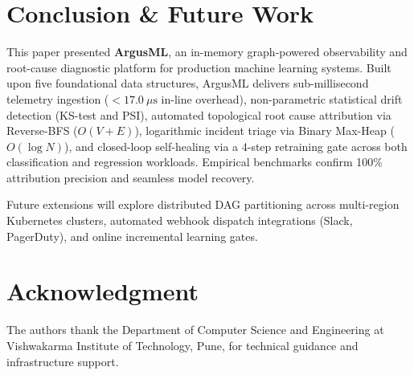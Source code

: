 \documentclass[conference]{IEEEtran}
\begin{document}
\section{Conclusion \& Future Work}
This paper presented \textbf{ArgusML}, an in-memory graph-powered observability and root-cause diagnostic platform for production machine learning systems. Built upon five foundational data structures, ArgusML delivers sub-millisecond telemetry ingestion ($<17.0\ \mu\text{s}$ in-line overhead), non-parametric statistical drift detection (KS-test and PSI), automated topological root cause attribution via Reverse-BFS ($O(V+E)$), logarithmic incident triage via Binary Max-Heap ($O(\log N)$), and closed-loop self-healing via a 4-step retraining gate across both classification and regression workloads. Empirical benchmarks confirm 100\% attribution precision and seamless model recovery.

Future extensions will explore distributed DAG partitioning across multi-region Kubernetes clusters, automated webhook dispatch integrations (Slack, PagerDuty), and online incremental learning gates.

\section*{Acknowledgment}
The authors thank the Department of Computer Science and Engineering at Vishwakarma Institute of Technology, Pune, for technical guidance and infrastructure support.
\end{document}
